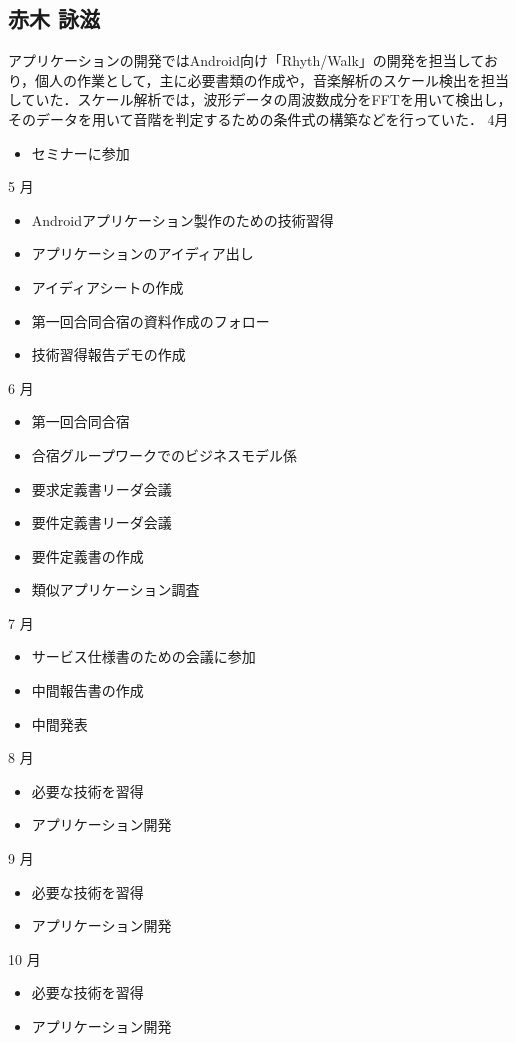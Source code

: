 \subsection{赤木 詠滋}
アプリケーションの開発ではAndroid向け「Rhyth/Walk」の開発を担当しており，個人の作業として，主に必要書類の作成や，音楽解析のスケール検出を担当していた．スケール解析では，波形データの周波数成分をFFTを用いて検出し，そのデータを用いて音階を判定するための条件式の構築などを行っていた．
4月
\begin{itemize}
\item セミナーに参加
\end{itemize}
5 月
\begin{itemize}
\item Androidアプリケーション製作のための技術習得
\item アプリケーションのアイディア出し
\item アイディアシートの作成
\item 第一回合同合宿の資料作成のフォロー
\item 技術習得報告デモの作成
\end{itemize}
6 月
\begin{itemize}
\item 第一回合同合宿
\item 合宿グループワークでのビジネスモデル係
\item 要求定義書リーダ会議
\item 要件定義書リーダ会議
\item 要件定義書の作成
\item 類似アプリケーション調査
\end{itemize}
7 月
\begin{itemize}
\item サービス仕様書のための会議に参加
\item 中間報告書の作成
\item 中間発表
\end{itemize}
8 月
\begin{itemize}
\item 必要な技術を習得
\item アプリケーション開発
\end{itemize}
9 月
\begin{itemize}
\item 必要な技術を習得
\item アプリケーション開発
\end{itemize}
10 月
\begin{itemize}
\item 必要な技術を習得
\item アプリケーション開発
\end{itemize}
